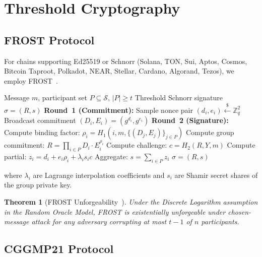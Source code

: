 \documentclass[11pt]{article}
\newtheorem{theorem}{Theorem}
\begin{document}
\section{Threshold Cryptography}
\label{sec:threshold}

\subsection{FROST Protocol}

For chains supporting Ed25519 or Schnorr (Solana, TON, Sui, Aptos, Cosmos, Bitcoin Taproot, Polkadot, NEAR, Stellar, Cardano, Algorand, Tezos), we employ FROST~\cite{frost}.

\begin{algorithm}
\caption{FROST $t$-of-$n$ Threshold Signing}
\begin{algorithmic}[1]
\Require Message $m$, participant set $P \subseteq \mathcal{S}$, $|P| \geq t$
\Ensure Threshold Schnorr signature $\sigma = (R, s)$
\State \textbf{Round~1 (Commitment):}
  \State Sample nonce pair $(d_i, e_i) \xleftarrow{\$} \mathbb{Z}_q^2$
  \State Broadcast commitment $(D_i, E_i) = (g^{d_i}, g^{e_i})$
\EndFor
\State \textbf{Round~2 (Signature):}
\State Compute binding factor: $\rho_i = H_1(i, m, \{(D_j, E_j)\}_{j \in P})$
\State Compute group commitment: $R = \prod_{i \in P} D_i \cdot E_i^{\rho_i}$
\State Compute challenge: $c = H_2(R, Y, m)$
  \State Compute partial: $z_i = d_i + e_i \rho_i + \lambda_i s_i c$
\EndFor
\State Aggregate: $s = \sum_{i \in P} z_i$
\State \Return $\sigma = (R, s)$
\end{algorithmic}
\end{algorithm}

where $\lambda_i$ are Lagrange interpolation coefficients and $s_i$ are Shamir secret shares of the group private key.

\begin{theorem}[FROST Unforgeability~\cite{frost}]
Under the Discrete Logarithm assumption in the Random Oracle Model, FROST is existentially unforgeable under chosen-message attack for any adversary corrupting at most $t - 1$ of $n$ participants.
\end{theorem}

\subsection{CGGMP21 Protocol}
\end{document}
